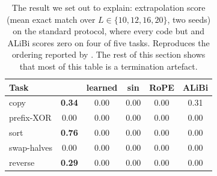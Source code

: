 \begin{table}[t]
\centering
\caption{The result we set out to explain: extrapolation score (mean exact match
over $L\in\{10,12,16,20\}$, two seeds) on the standard protocol, where every code
but \nope{} and ALiBi scores zero on four of five tasks. Reproduces the ordering
reported by \citet{kazemnejad2023impact}. The rest of this section shows that most
of this table is a termination artefact.}
\label{tab:main}
\small
\begin{tabular}{@{}lccccc@{}}
\toprule
Task & \nope{} & learned & sin & RoPE & ALiBi \\
\midrule
copy                & \textbf{0.34} & 0.00 & 0.00 & 0.00 & 0.31 \\
prefix-XOR          & 0.00 & 0.00 & 0.00 & 0.00 & 0.00 \\
sort                & \textbf{0.76} & 0.00 & 0.00 & 0.00 & 0.00 \\
swap-halves         & 0.00 & 0.00 & 0.00 & 0.00 & 0.00 \\
reverse             & \textbf{0.29} & 0.00 & 0.00 & 0.00 & 0.00 \\
\bottomrule
\end{tabular}
\end{table}
